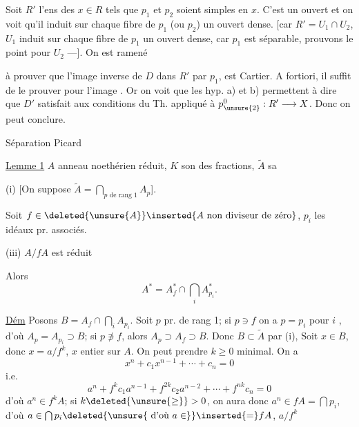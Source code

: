  Soit  $R'$ l'ens des $x\in R$ tels que $p_1$ et $p_2$ soient simples en $x$. C'est un ouvert et on voit qu'il induit sur chaque fibre de $p_1$ (ou $p_2$) un ouvert dense. [car $R'=U_1\cap U_2$, $U_1$ induit sur chaque fibre de $p_1$ un ouvert dense, car $p_1$ est séparable, prouvons le point pour $U_2$ ---]. On est ramené

à prouver que l'image inverse de $D$  dans $R'$ par $p_1$,  est Cartier. A fortiori, il suffit de le prouver pour l'image . Or  on voit que les hyp. a) et b) permettent à dire que $D'$ satisfait aux conditions du Th. appliqué à $p_{\unsure{2}}^0:R'\longrightarrow X$.  Donc on peut conclure.

Séparation  Picard

\uline{Lemme 1} $A$ anneau noethérien  réduit, $K$ son   des fractions, $\widetilde A$ sa  

(i) [On suppose $\widetilde A=\displaystyle\bigcap_{p\text{ de rang }1}A_p$]. 

Soit $f\in\deleted{\unsure{A}}\inserted{A\text{ non diviseur de zéro}}$, $p_i$ les idéaux pr. associés.


(iii) $A/fA$ est réduit


Alors
\[
\boxed{A^*=A_f^*\cap\bigcap_i A_{p_i}^*.}
\]

\uline{Dém} Posons $B=A_f\cap\displaystyle\bigcap_i A_{p_i}$. Soit $p$ pr. de rang 1; si $p\ni f$ on a $p=p_i$ pour $i$ , d'où $A_p=A_{p_i}\supset B$; si $p\not\ni f$, alors $A_p\supset A_f\supset B$. Donc $B\subset\widetilde A$ par (i),  Soit $x\in B$, donc $x=a/f^k$, $x$ entier sur $A$. On peut prendre $k\geq 0$ minimal.  On a
\[
x^n+c_1x^{n-1}+\cdots+c_n=0
\]
i.e.
\[
a^n+f^k c_1a^{n-1}+f^{2k}c_2a^{n-2}+\cdots+f^{nk}c_n=0
\]
d'où $a^n\in f^k A$; si $k\deleted{\unsure{\geq}} >0$, on aura donc $a^n\in fA=\bigcap p_i$, d'où $a\in\bigcap p_i\deleted{\unsure{\text{ d'où }a\in}}\inserted{=} fA$,    $a/f^k$


